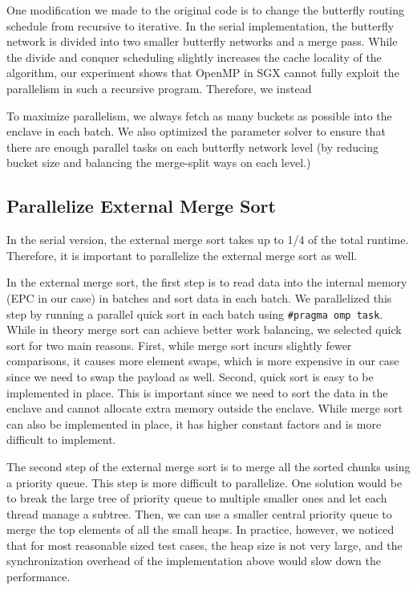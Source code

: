 \documentclass{article}
\begin{document}
One modification we made to the original code is to change the butterfly routing schedule from recursive to iterative. In the serial implementation, the butterfly network is divided into two smaller butterfly networks and a merge pass. While the divide and conquer scheduling slightly increases the cache locality of the algorithm, our experiment shows that OpenMP in SGX cannot fully exploit the parallelism in such a recursive program. Therefore, we instead 

To maximize parallelism, we always fetch as many buckets as possible into the enclave in each batch. We also optimized the parameter solver to ensure that there are enough parallel tasks on each butterfly network level (by reducing bucket size and balancing the merge-split ways on each level.)

\subsection{Parallelize External Merge Sort}
In the serial version, the external merge sort takes up to 1/4 of the total runtime. Therefore, it is important to parallelize the external merge sort as well.

In the external merge sort, the first step is to read data into the internal memory (EPC in our case) in batches and sort data in each batch. We parallelized this step by running a parallel quick sort in each batch using {\tt \#pragma omp task}. While in theory merge sort can achieve better work balancing, we selected quick sort for two main reasons. First, while merge sort incurs slightly fewer comparisons, it causes more element swaps, which is more expensive in our case since we need to swap the payload as well. Second, quick sort is easy to be implemented in place. This is important since we need to sort the data in the enclave and cannot allocate extra memory outside the enclave. While merge sort can also be implemented in place, it has higher constant factors and is more difficult to implement.

The second step of the external merge sort is to merge all the sorted chunks using a priority queue. This step is more difficult to parallelize. One solution would be to break the large tree of priority queue to multiple smaller ones and let each thread manage a subtree. Then, we can use a smaller central priority queue to merge the top elements of all the small heaps. In practice, however, we noticed that for most reasonable sized test cases, the heap size is not very large, and the synchronization overhead of the implementation above would slow down the performance. 
\end{document}
